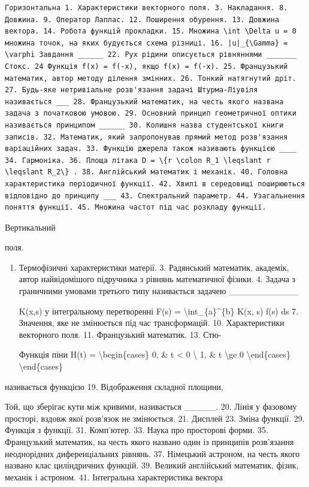 \documentclass[
]{article}
\begin{document}
\begin{verbatim}
Горизонтальна 1. Характеристики векторного поля. 3. Накладання. 8. Довжина. 9. Оператор Лаплас. 12. Поширення обурення. 13. Довжина вектора. 14. Робота функцій прокладки. 15. Множина \int \Delta u = 0 множина точок, на яких будується схема різниці. 16. |u|_{\Gamma} = \varphi Завдання ______ 22. Рух рідини описується рівняннями _______ Стокс. 24 Функція f(x) = f(-x), якщо f(x) = f(-x). 25. Французький математик, автор методу ділення змінних. 26. Тонкий натягнутий дріт. 27. Будь-яке нетривіальне розв'язання задачі Штурма-Ліувіля називається ___ 28. Французький математик, на честь якого названа задача з початковою умовою. 29. Основний принцип геометричної оптики називається принципом ______ 30. Колишня назва студентської книги записів. 32. Математик, який запропонував прямий метод розв'язання варіаційних задач. 33. Функцію джерела також називають функцією ____ 34. Гармоніка. 36. Площа літака D = \{r \colon R_1 \leqslant r \leqslant R_2\} . 38. Англійський математик і механік. 40. Головна характеристика періодичної функції. 42. Хвилі в середовищі поширюються відповідно до принципу ___ 43. Спектральний параметр. 44. Узагальнення поняття функції. 45. Множина частот під час розкладу функції.
\end{verbatim}

Вертикальний

поля.

\begin{enumerate}
\def\labelenumi{\arabic{enumi}.}
\setcounter{enumi}{1}
\item
  Термофізичні характеристики матерії. 3. Радянський математик,
  академік, автор найвідомішого підручника з рівнянь математичної
  фізики. 4. Задача з граничними умовами третього типу називається
  задачею \_\_\_\_\_\_\_\_\_\_\_

  K(x,s) у інтегральному перетворенні F(s) =
  \textbackslash int\_\{a\}\^{}\{b\} K(x, s) f(s) ds 7. Значення, яке не
  змінюється під час трансформацій. 10. Характеристики векторного поля.
  11. Французький математик. 13. Стю-

  Функція піни H(t) = \textbackslash begin\{cases\} 0, \& t \textless{}
  0 \textbackslash{} 1, \& t \textbackslash ge 0
  \textbackslash end\{cases\} \textbackslash end\{cases\}
\end{enumerate}

називається функцією 19. Відображення складної площини,

Той, що зберігає кути між кривими, називається \_\_\_\_\_. 20. Лінія у
фазовому просторі, вздовж якої розв'язок не змінюється. 21. Дисплей 23.
Зміна функції. 29. Функція з функції. 31. Комп'ютер. 33. Наука про
просторові форми. 35. Французький математик, на честь якого названо один
із принципів розв'язання неоднорідних диференціальних рівнянь. 37.
Німецький астроном, на честь якого названо клас циліндричних функцій.
39. Великий англійський математик, фізик, механік і астроном. 41.
Інтегральна характеристика вектора
\end{document}
